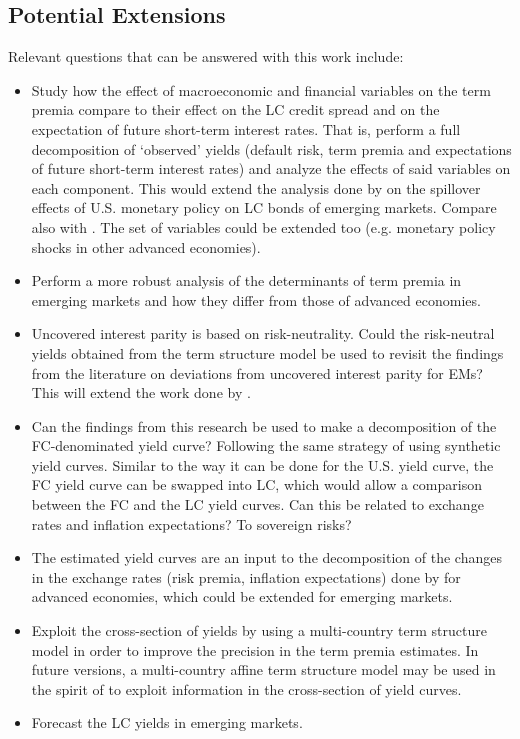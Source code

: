 \subsection{Potential Extensions}
\gototoc
Relevant questions that can be answered with this work include:

\begin{itemize}
	\item Study how the effect of macroeconomic and financial variables on the term premia compare to their effect on the LC credit spread and on the expectation of future short-term interest rates. That is, perform a full decomposition of `observed' yields (default risk, term premia and expectations of future short-term interest rates) and analyze the effects of said variables on each component. This would extend the analysis done by \cite{GilchristYueZakrajsek:2018} on the spillover effects of U.S. monetary policy on LC bonds of emerging markets. Compare also with \cite{HofmannShimShin:2017}. The set of variables could be extended too (e.g. monetary policy shocks in other advanced economies).
	
	\item Perform a more robust analysis of the determinants of term premia in emerging markets and how they differ from those of advanced economies.
		
	\item Uncovered interest parity is based on risk-neutrality. Could the risk-neutral yields obtained from the term structure model be used to revisit the findings from the literature on deviations from uncovered interest parity for EMs? This will extend the work done by \cite{AngChen:2010}.
	
	\item Can the findings from this research be used to make a decomposition of the FC-denominated yield curve? Following the same strategy of using synthetic yield curves. Similar to the way it can be done for the U.S. yield curve, the FC yield curve can be swapped into LC, which would allow a comparison between the FC and the LC yield curves. Can this be related to exchange rates and inflation expectations? To sovereign risks?
	
	\item The estimated yield curves are an input to the decomposition of the changes in the exchange rates (risk premia, inflation expectations) done by \cite{StavrakevaTang:2018b} for advanced economies, which could be extended for emerging markets.
	
	\item Exploit the cross-section of yields by using a multi-country term structure model in order to improve the precision in the term premia estimates. In future versions, a multi-country affine term structure model may be used in the spirit of \citet*{JotikasthiraLeLundblad:2015} to exploit information in the cross-section of yield curves.
	
	\item Forecast the LC yields in emerging markets.
\end{itemize}
